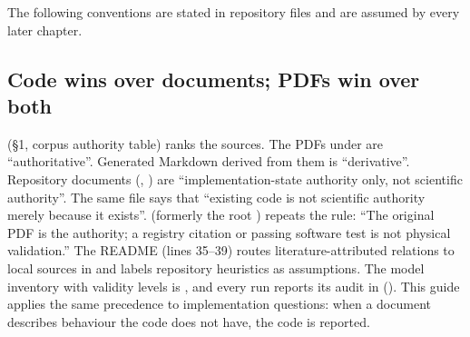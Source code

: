 The following conventions are stated in repository files and are assumed by every later chapter.

\subsection{Code wins over documents; PDFs win over both}
 (§1, corpus authority table) ranks the sources. The PDFs under  are ``authoritative''. Generated Markdown derived from them is ``derivative''. Repository documents (, ) are ``implementation-state authority only, not scientific authority''. The same file says that ``existing code is not scientific authority merely because it exists''.  (formerly the root ) repeats the rule: ``The original PDF is the authority; a registry citation or passing software test is not physical validation.'' The README (lines 35--39) routes literature-attributed relations to local sources in  and labels repository heuristics as assumptions. The model inventory with validity levels is , and every run reports its audit in  (). This guide applies the same precedence to implementation questions: when a document describes behaviour the code does not have, the code is reported.

